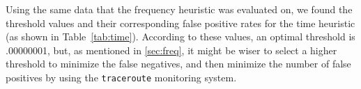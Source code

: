 Using the same data that the frequency heuristic was evaluated on, we found the threshold values and their corresponding false positive rates for the time heuristic (as shown in Table~\ref{tab:time}).  According to these values, an optimal threshold is .00000001, but, as mentioned in \ref{sec:freq}, it might be wiser to select a higher threshold to minimize the false negatives, and then minimize the number of false positives by using the {\tt traceroute} monitoring system.

